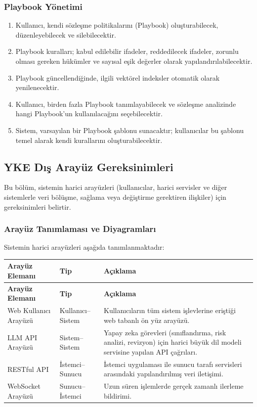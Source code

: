 \documentclass[12pt, a4paper]{article}
\begin{document}
\subsubsection{Playbook Yönetimi}
\begin{enumerate}[leftmargin=2cm]
    \item Kullanıcı, kendi sözleşme politikalarını (Playbook) oluşturabilecek, düzenleyebilecek ve silebilecektir.
    \item Playbook kuralları; kabul edilebilir ifadeler, reddedilecek ifadeler, zorunlu olması gereken hükümler ve sayısal eşik değerler olarak yapılandırılabilecektir.
    \item Playbook güncellendiğinde, ilgili vektörel indeksler otomatik olarak yenilenecektir.
    \item Kullanıcı, birden fazla Playbook tanımlayabilecek ve sözleşme analizinde hangi Playbook'un kullanılacağını seçebilecektir.
    \item Sistem, varsayılan bir Playbook şablonu sunacaktır; kullanıcılar bu şablonu temel alarak kendi kurallarını oluşturabilecektir.
\end{enumerate}

\subsection{YKE Dış Arayüz Gereksinimleri}

Bu bölüm, sistemin harici arayüzleri (kullanıcılar, harici servisler ve diğer sistemlerle veri bölüşme, sağlama veya değiştirme gerektiren ilişkiler) için gereksinimleri belirtir.

\subsubsection{Arayüz Tanımlaması ve Diyagramları}

Sistemin harici arayüzleri aşağıda tanımlanmaktadır:

\begin{longtable}{|p{3.5cm}|p{3cm}|p{7cm}|}
\hline
\textbf{Arayüz Elemanı} & \textbf{Tip} & \textbf{Açıklama} \\
\hline
\endfirsthead
\hline
\textbf{Arayüz Elemanı} & \textbf{Tip} & \textbf{Açıklama} \\
\hline
\endhead
Web Kullanıcı Arayüzü & Kullanıcı--Sistem & Kullanıcıların tüm sistem işlevlerine eriştiği web tabanlı ön yüz arayüzü. \\
\hline
LLM API Arayüzü & Sistem--Sistem & Yapay zeka görevleri (sınıflandırma, risk analizi, revizyon) için harici büyük dil modeli servisine yapılan API çağrıları. \\
\hline
RESTful API & İstemci--Sunucu & İstemci uygulaması ile sunucu tarafı servisleri arasındaki yapılandırılmış veri iletişimi. \\
\hline
WebSocket Arayüzü & Sunucu--İstemci & Uzun süren işlemlerde gerçek zamanlı ilerleme bildirimi. \\
\hline
\end{longtable}
\end{document}
